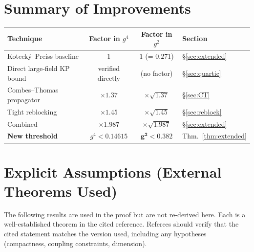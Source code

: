 \documentclass[11pt,a4paper]{amsart}
\theoremstyle{definition}
\begin{document}
\section*{Summary of Improvements}

\begin{center}
\renewcommand{\arraystretch}{1.3}
\begin{tabular}{lccl}
\hline
Technique & Factor in $g^4$ & Factor in $g^2$ & Section \\
\hline
Koteck\'y--Preiss baseline & $1$ & $1$ (= $0.271$) & \S\ref{sec:extended} \\
Direct large-field KP bound & verified directly & (no factor) & \S\ref{sec:quartic} \\
Combes--Thomas propagator  & $\times 1.37$ & $\times\sqrt{1.37}$ & \S\ref{sec:CT} \\
Tight reblocking           & $\times 1.45$ & $\times\sqrt{1.45}$ & \S\ref{sec:reblock} \\
\hline
Combined & $\times 1.987$ & $\times\sqrt{1.987}$ & \S\ref{sec:extended} \\
\textbf{New threshold}
  & $g^4 < 0.14615$ & $\mathbf{g^2 < 0.382}$ & Thm.~\ref{thm:extended} \\
\hline
\end{tabular}
\end{center}

\section*{Explicit Assumptions (External Theorems Used)}
\label{sec:assumptions}

The following results are used in the proof but are not re-derived here.
Each is a well-established theorem in the cited reference.  Referees should
verify that the cited statement matches the version used, including any
hypotheses (compactness, coupling constraints, dimension).
\end{document}
